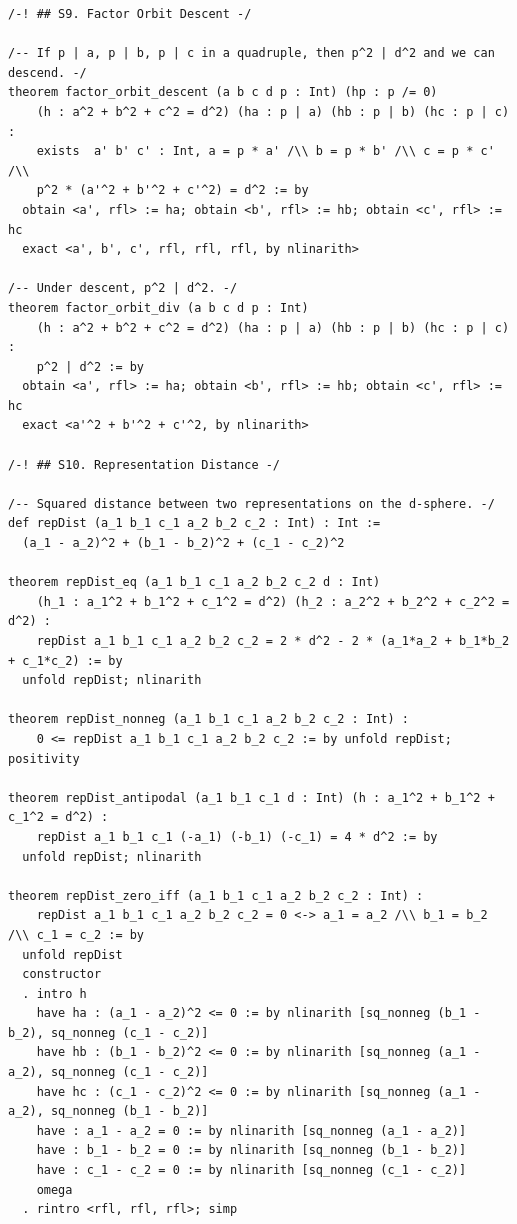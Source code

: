 \documentclass[11pt,openright,twoside]{book}
\theoremstyle{definition}
\begin{document}
\begin{lstlisting}[style=lean]
/-! ## S9. Factor Orbit Descent -/

/-- If p | a, p | b, p | c in a quadruple, then p^2 | d^2 and we can descend. -/
theorem factor_orbit_descent (a b c d p : Int) (hp : p /= 0)
    (h : a^2 + b^2 + c^2 = d^2) (ha : p | a) (hb : p | b) (hc : p | c) :
    exists  a' b' c' : Int, a = p * a' /\\ b = p * b' /\\ c = p * c' /\\
    p^2 * (a'^2 + b'^2 + c'^2) = d^2 := by
  obtain <a', rfl> := ha; obtain <b', rfl> := hb; obtain <c', rfl> := hc
  exact <a', b', c', rfl, rfl, rfl, by nlinarith>

/-- Under descent, p^2 | d^2. -/
theorem factor_orbit_div (a b c d p : Int)
    (h : a^2 + b^2 + c^2 = d^2) (ha : p | a) (hb : p | b) (hc : p | c) :
    p^2 | d^2 := by
  obtain <a', rfl> := ha; obtain <b', rfl> := hb; obtain <c', rfl> := hc
  exact <a'^2 + b'^2 + c'^2, by nlinarith>

/-! ## S10. Representation Distance -/

/-- Squared distance between two representations on the d-sphere. -/
def repDist (a_1 b_1 c_1 a_2 b_2 c_2 : Int) : Int :=
  (a_1 - a_2)^2 + (b_1 - b_2)^2 + (c_1 - c_2)^2

theorem repDist_eq (a_1 b_1 c_1 a_2 b_2 c_2 d : Int)
    (h_1 : a_1^2 + b_1^2 + c_1^2 = d^2) (h_2 : a_2^2 + b_2^2 + c_2^2 = d^2) :
    repDist a_1 b_1 c_1 a_2 b_2 c_2 = 2 * d^2 - 2 * (a_1*a_2 + b_1*b_2 + c_1*c_2) := by
  unfold repDist; nlinarith

theorem repDist_nonneg (a_1 b_1 c_1 a_2 b_2 c_2 : Int) :
    0 <= repDist a_1 b_1 c_1 a_2 b_2 c_2 := by unfold repDist; positivity

theorem repDist_antipodal (a_1 b_1 c_1 d : Int) (h : a_1^2 + b_1^2 + c_1^2 = d^2) :
    repDist a_1 b_1 c_1 (-a_1) (-b_1) (-c_1) = 4 * d^2 := by
  unfold repDist; nlinarith

theorem repDist_zero_iff (a_1 b_1 c_1 a_2 b_2 c_2 : Int) :
    repDist a_1 b_1 c_1 a_2 b_2 c_2 = 0 <-> a_1 = a_2 /\\ b_1 = b_2 /\\ c_1 = c_2 := by
  unfold repDist
  constructor
  . intro h
    have ha : (a_1 - a_2)^2 <= 0 := by nlinarith [sq_nonneg (b_1 - b_2), sq_nonneg (c_1 - c_2)]
    have hb : (b_1 - b_2)^2 <= 0 := by nlinarith [sq_nonneg (a_1 - a_2), sq_nonneg (c_1 - c_2)]
    have hc : (c_1 - c_2)^2 <= 0 := by nlinarith [sq_nonneg (a_1 - a_2), sq_nonneg (b_1 - b_2)]
    have : a_1 - a_2 = 0 := by nlinarith [sq_nonneg (a_1 - a_2)]
    have : b_1 - b_2 = 0 := by nlinarith [sq_nonneg (b_1 - b_2)]
    have : c_1 - c_2 = 0 := by nlinarith [sq_nonneg (c_1 - c_2)]
    omega
  . rintro <rfl, rfl, rfl>; simp


\end{lstlisting}
\end{document}
